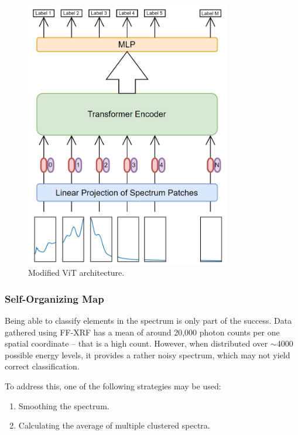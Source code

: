 \begin{figure}[H] 
  \centering     
  \includegraphics[width=0.8\textwidth]{img/vit_changed.png} 
  \caption{Modified ViT architecture.}
  \label{fig:modified-vit-architecture}
\end{figure}






\subsubsection{Self-Organizing Map}
Being able to classify elements in the spectrum is only part of the success. Data gathered using FF-XRF has a mean of around 20,000 photon counts per one spatial coordinate – that is a high count. However, when distributed over $\sim$4000 possible energy levels, it provides a rather noisy spectrum, which may not yield correct classification.

To address this, one of the following strategies may be used:
\begin{enumerate}
  \item Smoothing the spectrum.
  \item Calculating the average of multiple clustered spectra.
\end{enumerate}

